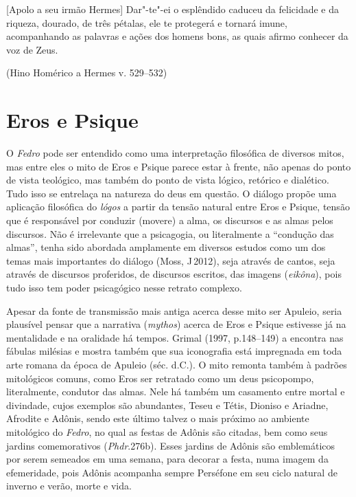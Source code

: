 

\epigraph{[Apolo a seu irmão Hermes] Dar"-te"-ei o esplêndido caduceu da felicidade e da riqueza, dourado, de
três pétalas, ele te protegerá e tornará imune, acompanhando as
palavras e ações dos homens bons, as quais afirmo conhecer da voz de
Zeus.}{(Hino Homérico a Hermes v. 529--532)} 


\section{Eros e Psique}
 

O \emph{Fedro} pode ser entendido como uma interpretação filosófica de
diversos mitos, mas entre eles o mito de Eros e Psique parece estar à
frente, não apenas do ponto de vista teológico, mas também do ponto de
vista lógico, retórico e dialético. Tudo isso se entrelaça na natureza
do deus em questão. O diálogo propõe uma aplicação filosófica
do \emph{lógos} a partir da tensão natural entre Eros e Psique, tensão
que é responsável por conduzir (movere) a alma, os discursos e as almas
pelos discursos\emph{.} Não é irrelevante que a psicagogia, ou
literalmente a ``condução das almas'', tenha sido abordada amplamente em
diversos estudos como um dos temas mais importantes do diálogo (Moss, J\,2012), seja através de cantos, seja através de discursos proferidos, de
discursos escritos, das imagens (\emph{eikôna}), pois tudo isso tem
poder psicagógico nesse retrato complexo.

Apesar da fonte de transmissão mais antiga acerca desse mito ser
Apuleio, seria plausível pensar que a narrativa (\emph{mythos}) acerca de Eros e
Psique estivesse já na mentalidade e na oralidade há tempos.
Grimal (1997, p.148--149) a encontra nas fábulas milésias e
mostra também que sua iconografia está impregnada em toda arte romana da
época de Apuleio (séc.  d.C.). O mito remonta também à padrões
mitológicos comuns, como Eros ser retratado como um deus psicopompo,
literalmente, condutor das almas. Nele há também um casamento entre
mortal e divindade, cujos exemplos são abundantes, Teseu e Tétis,
Dioniso e Ariadne, Afrodite e Adônis, sendo este último talvez o mais
próximo ao ambiente mitológico do \emph{Fedro}, no qual as festas de
Adônis são citadas, bem como seus jardins comemorativos
(\emph{Phdr}.276b). Esses jardins de Adônis são emblemáticos por serem
semeados em uma semana, para decorar a festa, numa imagem da
efemeridade, pois Adônis acompanha sempre Perséfone em seu ciclo natural de
inverno e verão, morte e vida.

